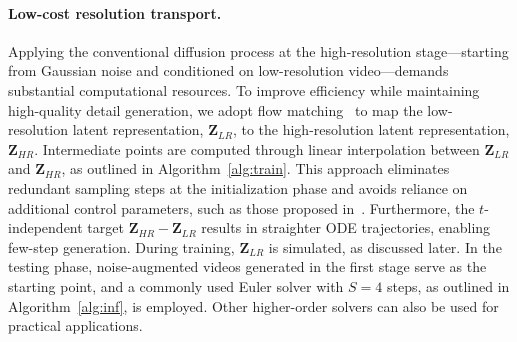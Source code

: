 \paragraph{Low-cost resolution transport.} Applying the conventional diffusion process at the high-resolution stage—starting from Gaussian noise and conditioned on low-resolution video—demands substantial computational resources. To improve efficiency while maintaining high-quality detail generation, we adopt flow matching~\citep{rectifiedflow, fm} to map the low-resolution latent representation, $\mathbf{Z}_{LR}$, to the high-resolution latent representation, $\mathbf{Z}_{HR}$. Intermediate points are computed through linear interpolation between $\mathbf{Z}_{LR}$ and $\mathbf{Z}_{HR}$, as outlined in Algorithm~\ref{alg:train}. This approach eliminates redundant sampling steps at the initialization phase and avoids reliance on additional control parameters, such as those proposed in~\citep{controlnet, supir, venhancer}. Furthermore, the $t$-independent target $\mathbf{Z}_{HR} - \mathbf{Z}_{LR}$ results in straighter ODE trajectories, enabling few-step generation. During training, $\mathbf{Z}_{LR}$ is simulated, as discussed later. In the testing phase, noise-augmented videos generated in the first stage serve as the starting point, and a commonly used Euler solver with $S=4$ steps, as outlined in Algorithm~\ref{alg:inf}, is employed. Other higher-order solvers can also be used for practical applications.



